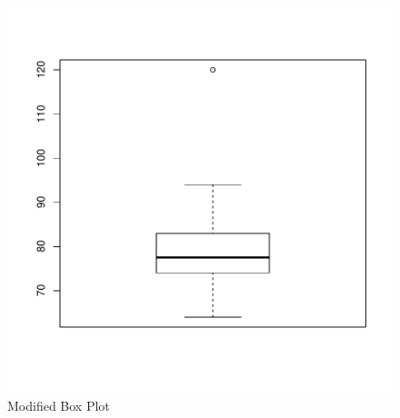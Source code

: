 \documentclass[twocolumn,english]{IEEEtran}
\theoremstyle{plain}
\theoremstyle{plain}
\begin{document}
\begin{figure}[h!]
\begin{centering}
\includegraphics{proj1-boxplot1}
\caption{Modified Box Plot}
\label{fig:one}
\end{centering}
\end{figure}

%
%
\end{document}
